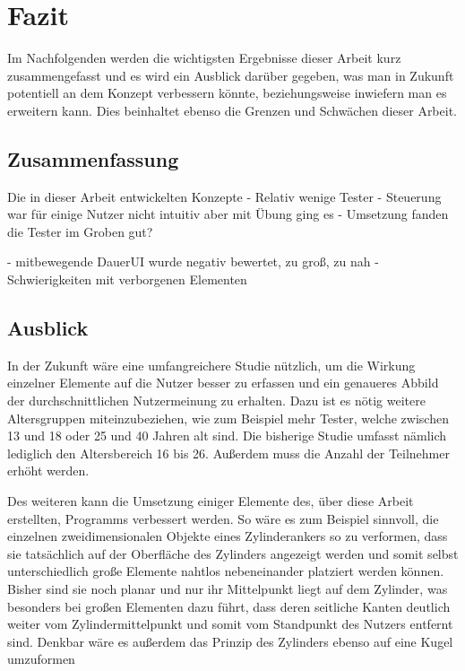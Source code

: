 
\chapter{Fazit}\label{chapter:conclusion}

	Im Nachfolgenden werden die wichtigsten Ergebnisse dieser Arbeit kurz zusammengefasst und es wird ein Ausblick darüber gegeben, was man in Zukunft potentiell an dem Konzept verbessern könnte, beziehungsweise inwiefern man es erweitern kann. Dies beinhaltet ebenso die Grenzen und Schwächen dieser Arbeit.

	\section{Zusammenfassung}
	
		Die in dieser Arbeit entwickelten Konzepte
		- Relativ wenige Tester
		- Steuerung war für einige Nutzer nicht intuitiv aber mit Übung ging es
		- Umsetzung fanden die Tester im Groben gut?
		
		- mitbewegende DauerUI wurde negativ bewertet, zu groß, zu nah
		- Schwierigkeiten mit verborgenen Elementen
	
	\section{Ausblick}
		
		In der Zukunft wäre eine umfangreichere Studie nützlich, um die Wirkung einzelner Elemente auf die Nutzer besser zu erfassen und ein genaueres Abbild der durchschnittlichen Nutzermeinung zu erhalten. Dazu ist es nötig weitere Altersgruppen miteinzubeziehen, wie zum Beispiel mehr Tester, welche zwischen 13 und 18 oder 25 und 40 Jahren alt sind. Die bisherige Studie umfasst nämlich lediglich den Altersbereich 16 bis 26. Außerdem muss die Anzahl der Teilnehmer erhöht werden.
		
		
		Des weiteren kann die Umsetzung einiger Elemente des, über diese Arbeit erstellten, Programms verbessert werden. So wäre es zum Beispiel sinnvoll, die einzelnen zweidimensionalen Objekte eines Zylinderankers so zu verformen, dass sie tatsächlich auf der Oberfläche des Zylinders angezeigt werden und somit selbst unterschiedlich große Elemente nahtlos nebeneinander platziert werden können. Bisher sind sie noch planar und nur ihr Mittelpunkt  liegt auf dem Zylinder, was besonders bei großen Elementen dazu führt, dass deren seitliche Kanten deutlich weiter vom Zylindermittelpunkt und somit vom Standpunkt des Nutzers entfernt sind.
		Denkbar wäre es außerdem das Prinzip des Zylinders ebenso auf eine Kugel umzuformen
		
